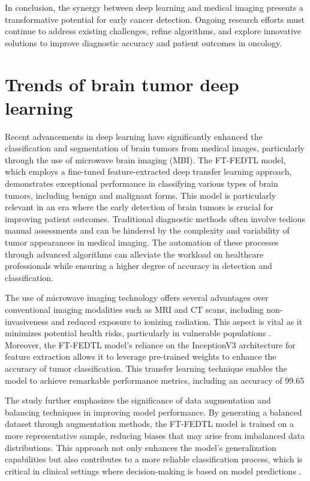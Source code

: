 \documentclass[runningheads]{llncs}
\begin{document}
In conclusion, the synergy between deep learning and medical imaging presents a transformative potential for early cancer detection. Ongoing research efforts must continue to address existing challenges, refine algorithms, and explore innovative solutions to improve diagnostic accuracy and patient outcomes in oncology.
\section{Trends of brain tumor deep learning}
Recent advancements in deep learning have significantly enhanced the classification and segmentation of brain tumors from medical images, particularly through the use of microwave brain imaging (MBI). The FT-FEDTL model, which employs a fine-tuned feature-extracted deep transfer learning approach, demonstrates exceptional performance in classifying various types of brain tumors, including benign and malignant forms. This model is particularly relevant in an era where the early detection of brain tumors is crucial for improving patient outcomes. Traditional diagnostic methods often involve tedious manual assessments and can be hindered by the complexity and variability of tumor appearances in medical imaging. The automation of these processes through advanced algorithms can alleviate the workload on healthcare professionals while ensuring a higher degree of accuracy in detection and classification.

The use of microwave imaging technology offers several advantages over conventional imaging modalities such as MRI and CT scans, including non-invasiveness and reduced exposure to ionizing radiation. This aspect is vital as it minimizes potential health risks, particularly in vulnerable populations \cite{Kashfia_2023}. Moreover, the FT-FEDTL model's reliance on the InceptionV3 architecture for feature extraction allows it to leverage pre-trained weights to enhance the accuracy of tumor classification. This transfer learning technique enables the model to achieve remarkable performance metrics, including an accuracy of 99.65%

The study further emphasizes the significance of data augmentation and balancing techniques in improving model performance. By generating a balanced dataset through augmentation methods, the FT-FEDTL model is trained on a more representative sample, reducing biases that may arise from imbalanced data distributions. This approach not only enhances the model's generalization capabilities but also contributes to a more reliable classification process, which is critical in clinical settings where decision-making is based on model predictions \cite{Kashfia_2023}.
\end{document}
